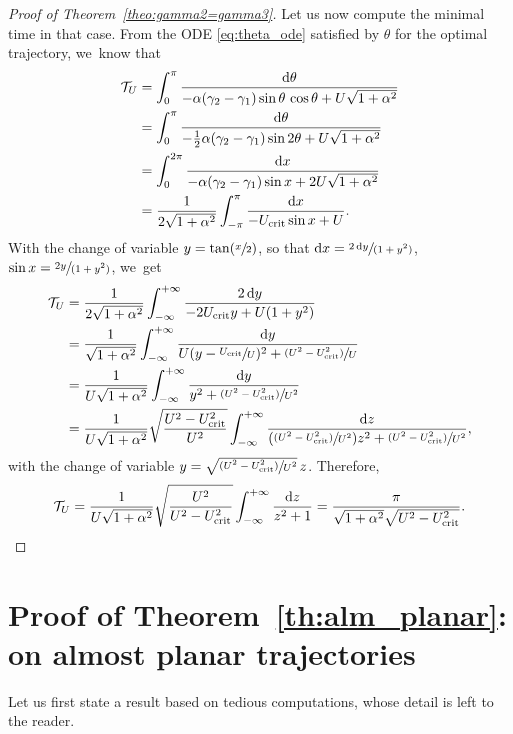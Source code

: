 \documentclass[JEP,XML,SOM,Unicode,NoEqCountersInSection,NoFloatCountersInSection,published]{cedram}
\newcommand{\psfrac}[2]{\sfrac{(#1)}{#2}}
\newcommand{\spfrac}[2]{\sfrac{#1}{(#2)}}
\newcommand{\Psfrac}[2]{(\sfrac{#1}{#2})}
\newcommand{\Ppsfrac}[2]{(\psfrac{#1}{#2})}
\theoremstyle{definition}
\newcommand*\diff{\mathop{}\!\mathrm{d}}
\begin{document}
\begin{proof}[Proof of Theorem~\ref{theo:gamma2=gamma3}]
Let us now compute the minimal time in that case. From the ODE \eqref{eq:theta_ode} satisfied by $\theta$ for the optimal trajectory, we~know that
\begin{align*}
\mathcal{T}_U &= \int_0^\pi \frac{\diff \theta}{- \alpha (\gamma_2 - \gamma_1) \sin{\theta} \, \cos{\theta} + U \sqrt{1 + \alpha^2}} \\
&= \int_0^\pi \frac{\diff \theta}{- \frac{1}{2} \alpha (\gamma_2 - \gamma_1) \sin{2 \theta} + U \sqrt{1 + \alpha^2}} \\
&= \int_0^{2 \pi} \frac{\diff x}{- \alpha (\gamma_2 - \gamma_1) \sin{x} + 2 U \sqrt{1 + \alpha^2}} \\
&= \frac{1}{2 \sqrt{1 + \alpha^2}} \int_{- \pi}^{\pi} \frac{\diff x}{- U_\textnormal{crit} \sin{x} + U}.
\end{align*}
With the change of variable $y = \tan \Psfrac{x}{2}$, so that $\diff x = \spfrac{2 \diff y}{1 + y^2}$, $\sin x = \spfrac{2 y}{1 + y^2}$, we~get
\begin{align*}
\mathcal{T}_U &= \frac{1}{2 \sqrt{1 + \alpha^2}} \int_{-\infty}^{+ \infty} \frac{2 \diff y}{- 2 U_\textnormal{crit} y + U (1 + y^2)} \\
&= \frac{1}{\sqrt{1 + \alpha^2}} \int_{-\infty}^{+ \infty} \frac{\diff y}{U(y - \sfrac{U_\textnormal{crit}}{U})^2 + \psfrac{U^2 - U_\textnormal{crit}^2}{U}} \\
&= \frac{1}{U \sqrt{1 + \alpha^2}} \int_{-\infty}^{+ \infty} \frac{\diff y}{y^2 + \psfrac{U^2 - U_\textnormal{crit}^2}{U^2}} \\
&= \frac{1}{U \sqrt{1 + \alpha^2}} \sqrt{\frac{U^2 - U_\textnormal{crit}^2}{U^2}} \int_{-\infty}^{+ \infty} \frac{\diff z}{\Ppsfrac{U^2 - U_\textnormal{crit}^2}{U^2} z^2 + \psfrac{U^2 - U_\textnormal{crit}^2}{U^2}},
\end{align*}
with the change of variable $y = \sqrt{\psfrac{U^2 - U_\textnormal{crit}^2}{U^2}}\, z$. Therefore,
\[
\mathcal{T}_U = \frac{1}{U \sqrt{1 + \alpha^2}} \sqrt{\frac{U^2}{U^2 - U_\textnormal{crit}^2}} \int_{-\infty}^{+ \infty} \frac{\diff z}{z^2 + 1} = \frac{\pi}{\sqrt{1 + \alpha^2} \sqrt{U^2 - U_\textnormal{crit}^2}}. \qedhere
\]
\end{proof}

\section{Proof of Theorem~\ref{th:alm_planar}: on almost planar trajectories}\label{proof:theo8}

Let us first state a result based on tedious computations, whose detail is left to the reader.
\end{document}
